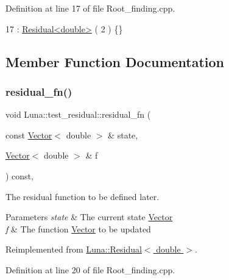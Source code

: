 Definition at line 17 of file Root\+\_\+finding.\+cpp.


\begin{DoxyCode}
17 : \hyperlink{classLuna_1_1Residual}{Residual<double>} ( 2 ) \{\}
\end{DoxyCode}


\subsection{Member Function Documentation}
\mbox{\label{classLuna_1_1test__residual_abf5e77702d2ffec8bf2ffdc6728a8473}} 
\subsubsection{\texorpdfstring{residual\+\_\+fn()}{residual\_fn()}}
{\footnotesize\ttfamily void Luna\+::test\+\_\+residual\+::residual\+\_\+fn (\begin{DoxyParamCaption}\item[{const \hyperlink{classLuna_1_1Vector}{Vector}$<$ double $>$ \&}]{state,  }\item[{\hyperlink{classLuna_1_1Vector}{Vector}$<$ double $>$ \&}]{f }\end{DoxyParamCaption}) const\hspace{0.3cm}{\ttfamily [inline]}, {\ttfamily [virtual]}}



The residual function to be defined later. 


\begin{DoxyParams}{Parameters}
{\em state} & The current state \hyperlink{classLuna_1_1Vector}{Vector} \\
\hline
{\em f} & The function \hyperlink{classLuna_1_1Vector}{Vector} to be updated \\
\hline
\end{DoxyParams}


Reimplemented from \hyperlink{classLuna_1_1Residual_ae1b1ebe3314c788b176bcac7b328de5c}{Luna\+::\+Residual$<$ double $>$}.



Definition at line 20 of file Root\+\_\+finding.\+cpp.


